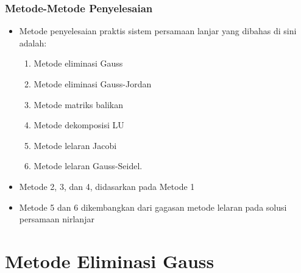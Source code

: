 \documentclass[pdflatex,compress,mathserif]{beamer}
\begin{document}
\begin{frame}
	\frametitle{Metode-Metode Penyelesaian}
	\begin{itemize}
		\item Metode penyelesaian praktis sistem persamaan lanjar yang dibahas di sini adalah:
		\begin{enumerate}
			\item Metode eliminasi Gauss 
			\item Metode eliminasi Gauss-Jordan
			\item Metode matriks balikan
			\item Metode dekomposisi LU
			\item Metode lelaran Jacobi
			\item Metode lelaran Gauss-Seidel.
		\end{enumerate}
		\item Metode 2, 3, dan 4, didasarkan pada Metode 1
		\item Metode 5 dan 6 dikembangkan dari gagasan metode lelaran pada solusi persamaan nirlanjar
	\end{itemize}
\end{frame}

\section{Metode Eliminasi Gauss}
\end{document}
